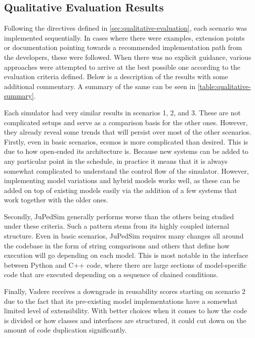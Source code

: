 \documentclass[twoside, 11pt]{article}
\begin{document}
\subsection{Qualitative Evaluation Results}

Following the directives defined in \autoref{sec:qualitative-evaluation}, each scenario was implemented sequentially. In cases where there were examples, extension points or documentation pointing towards a recommended implementation path from the developers, these were followed. When there was no explicit guidance, various approaches were attempted to arrive at the best possible one according to the evaluation criteria defined. Below is a description of the results with some additional commentary. A summary of the same can be seen in \autoref{table:qualitative-summary}.

Each simulator had very similar results in scenarios 1, 2, and 3. These are not complicated setups and serve as a comparison basis for the other ones. However, they already reveal some trends that will persist over most of the other scenarios. Firstly, even in basic scenarios, \gls{ecsmos} is more complicated than desired. This is due to how open-ended its architecture is. Because new systems can be added to any particular point in the schedule, in practice it means that it is always somewhat complicated to understand the control flow of the simulator. However, implementing model variations and hybrid models works well, as these can be added on top of existing models easily via the addition of a few systems that work together with the older ones.

Secondly, JuPedSim generally performs worse than the others being studied under these criteria. Such a pattern stems from its highly coupled internal structure. Even in basic scenarios, JuPedSim requires many changes all around the codebase in the form of string comparisons and others that define how execution will go depending on each model. This is most notable in the interface between Python and C++ code, where there are large sections of model-specific code that are executed depending on a sequence of chained conditions.

Finally, Vadere receives a downgrade in reusability scores starting on scenario 2 due to the fact that its pre-existing model implementations have a somewhat limited level of extensibility. With better choices when it comes to how the code is divided or how classes and interfaces are structured, it could cut down on the amount of code duplication significantly.
\end{document}
